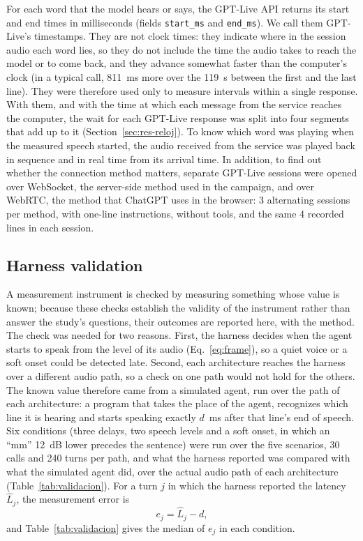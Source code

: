 \documentclass[11pt]{article}
\newcommand{\RRelojDerivaLapsoMed}{119}
\newcommand{\RRelojDerivaMed}{811}
\newcommand{\RValCorridas}{30}
\newcommand{\RValTurnos}{240}
\newcommand{\RViaLineas}{4}
\newcommand{\RViaSesiones}{3}
\begin{document}
For each word that the model hears or says, the GPT-Live API returns its start and
end times in milliseconds (fields \texttt{start\_ms} and \texttt{end\_ms}). We call them
GPT-Live's timestamps. They are not clock times: they indicate where in the
session audio each word lies, so they do not include the time the audio takes to
reach the model or to come back, and they advance somewhat faster than the
computer's clock (in a typical call, \RRelojDerivaMed~ms more over the
\RRelojDerivaLapsoMed~s between the first and the last line). They were therefore used only to measure intervals within a single response. With them, and with the time at
which each message from the service reaches the computer, the wait for each GPT-Live
response was split into four segments that add up to it
(Section~\ref{sec:res-reloj}). To know which word was playing when the measured speech
started, the audio received from the service was played back in sequence and in real
time from its arrival time. In addition, to find out whether the connection method
matters, separate GPT-Live sessions were opened over WebSocket, the server-side method
used in the campaign, and over WebRTC, the method that ChatGPT uses in the browser:
\RViaSesiones{} alternating sessions per method, with one-line instructions, without
tools, and the same \RViaLineas{} recorded lines in each session.

\subsection{Harness validation}\label{sec:validacion}

A measurement instrument is checked by measuring something whose value is known; because these checks establish the validity of the instrument rather than answer the study's questions, their outcomes are reported here, with the method.
The check was needed for two reasons.
First, the harness decides when the agent starts to speak from the level of its audio (Eq.~\ref{eq:frame}), so a quiet voice or a soft onset could be detected late.
Second, each architecture reaches the harness over a different audio path, so a check on one path would not hold for the others.
The known value therefore came from a simulated agent, run over the path of each architecture: a program that takes the place of the agent,
recognizes which line it is hearing and starts speaking exactly $d$~ms after that
line's end of speech. Six conditions (three delays, two speech levels and a soft
onset, in which an ``mm'' 12~dB lower precedes the sentence) were run over the five
scenarios, \RValCorridas{} calls and \RValTurnos{} turns per path, and what the
harness reported was compared with what the simulated agent did, over the actual
audio path of each architecture (Table~\ref{tab:validacion}).
For a turn $j$ in which the harness reported the latency $\hat{L}_j$, the measurement error is
\begin{equation}
e_j=\hat{L}_j-d ,
\label{eq:error}
\end{equation}
and Table~\ref{tab:validacion} gives the median of $e_j$ in each condition.
\end{document}
